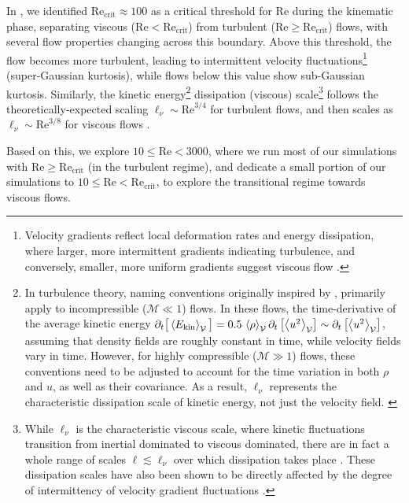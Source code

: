 \documentclass[12pt,twoside]{extreport}
\newcommand{\sbrac}[1]{\left[ #1 \right]} %
\newcommand{\mAve}[1]{\left\langle #1 \right\rangle} %
\newcommand{\mpp}[1]{\partial #1}
\newcommand{\mReh}{\ensuremath{\mathrm{Re}}} %
\newcommand{\mSonicMach}{\ensuremath{\mathcal{M}}} %
\newcommand{\mVolume}{\ensuremath{\mathcal{V}}} %
\newcommand{\eg}{e.g.,\xspace} %
\begin{document}
In , we identified $\mReh_\mathrm{crit} \approx 100$ as a critical threshold for $\mReh$ during the kinematic phase, separating viscous ($\mReh < \mReh_\mathrm{crit}$) from turbulent ($\mReh \geq \mReh_\mathrm{crit}$) flows, with several flow properties changing across this boundary. Above this threshold, the flow becomes more turbulent, leading to intermittent velocity fluctuations\footnote{
    Velocity gradients reflect local deformation rates and energy dissipation, where larger, more intermittent gradients indicating turbulence, and conversely, smaller, more uniform gradients suggest viscous flow \citep{schumacher2014small}.
} (super-Gaussian kurtosis), while flows below this value show sub-Gaussian kurtosis. Similarly, the kinetic energy\footnote{
    In turbulence theory, naming conventions originally inspired by \citet{kolmogorov1941dissipation}, primarily apply to incompressible (\mbox{$\mSonicMach \ll 1$}) flows. In these flows, the time-derivative of the average kinetic energy $\mpp_t\big[\mAve{E_\mathrm{kin}}_\mVolume\big] = 0.5\, \mAve{\rho}_\mVolume \mpp_t\sbrac{\mAve{u^2}_\mVolume} \sim \mpp_t\sbrac{\mAve{u^2}_\mVolume}$, assuming that density fields are roughly constant in time, while velocity fields vary in time. However, for highly compressible ($\mSonicMach \gg 1$) flows, these conventions need to be adjusted to account for the time variation in both $\rho$ and $u$, as well as their covariance. As a result, $\ell_\nu$ represents the characteristic dissipation scale of kinetic energy, not just the velocity field.
    \label{note:naming_convesions}
} dissipation (viscous) scale\footnote{
    While $\ell_\nu$ is the characteristic viscous scale, where kinetic fluctuations transition from inertial dominated to viscous dominated, there are in fact a whole range of scales $\ell \lesssim \ell_\nu$ over which dissipation takes place \citep[\eg][]{frisch1991prediction, chen1993far}. These dissipation scales have also been shown to be directly affected by the degree of intermittency of velocity gradient fluctuations \citep[\eg][]{schumacher2007sub}.
} follows the theoretically-expected scaling $\ell_\nu \sim \mReh^{3/4}$ \citep{kolmogorov1941dissipation} for turbulent flows, and then scales as $\ell_\nu \sim \mReh^{3/8}$ for viscous flows .


Based on this, we explore $10 \leq \mReh < 3000$, where we run most of our simulations with $\mReh \geq \mReh_\mathrm{crit}$ (in the turbulent regime), and dedicate a small portion of our simulations to $10 \leq \mReh < \mReh_\mathrm{crit}$, to explore the transitional regime towards viscous flows.
\end{document}
